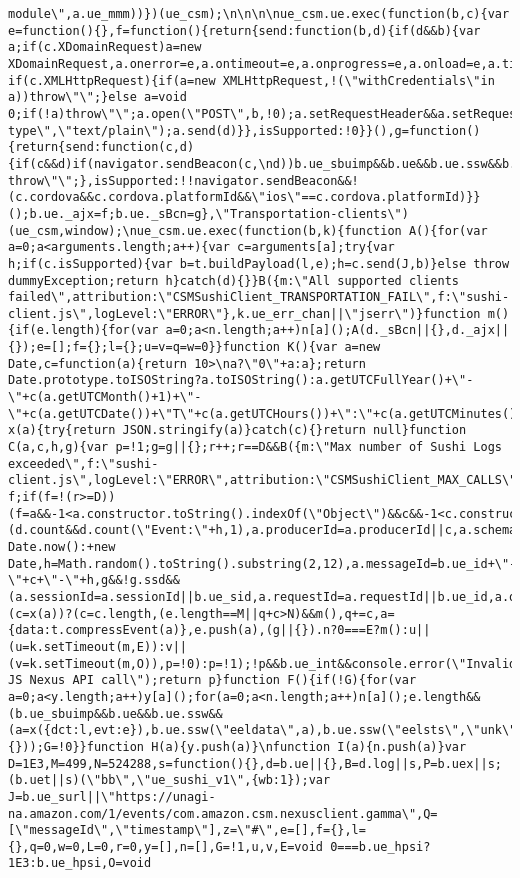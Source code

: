 \documentclass[
]{article}
\begin{document}
\begin{verbatim}
module\",a.ue_mmm))})(ue_csm);\n\n\n\nue_csm.ue.exec(function(b,c){var e=function(){},f=function(){return{send:function(b,d){if(d&&b){var a;if(c.XDomainRequest)a=new XDomainRequest,a.onerror=e,a.ontimeout=e,a.onprogress=e,a.onload=e,a.timeout=0;else if(c.XMLHttpRequest){if(a=new XMLHttpRequest,!(\"withCredentials\"in a))throw\"\";}else a=void 0;if(!a)throw\"\";a.open(\"POST\",b,!0);a.setRequestHeader&&a.setRequestHeader(\"Content-type\",\"text/plain\");a.send(d)}},isSupported:!0}}(),g=function(){return{send:function(c,d){if(c&&d)if(navigator.sendBeacon(c,\nd))b.ue_sbuimp&&b.ue&&b.ue.ssw&&b.ue.ssw(\"eelsts\",\"scs\");else throw\"\";},isSupported:!!navigator.sendBeacon&&!(c.cordova&&c.cordova.platformId&&\"ios\"==c.cordova.platformId)}}();b.ue._ajx=f;b.ue._sBcn=g},\"Transportation-clients\")(ue_csm,window);\nue_csm.ue.exec(function(b,k){function A(){for(var a=0;a<arguments.length;a++){var c=arguments[a];try{var h;if(c.isSupported){var b=t.buildPayload(l,e);h=c.send(J,b)}else throw dummyException;return h}catch(d){}}B({m:\"All supported clients failed\",attribution:\"CSMSushiClient_TRANSPORTATION_FAIL\",f:\"sushi-client.js\",logLevel:\"ERROR\"},k.ue_err_chan||\"jserr\")}function m(){if(e.length){for(var a=0;a<n.length;a++)n[a]();A(d._sBcn||{},d._ajx||{});e=[];f={};l={};u=v=q=w=0}}function K(){var a=new Date,c=function(a){return 10>\na?\"0\"+a:a};return Date.prototype.toISOString?a.toISOString():a.getUTCFullYear()+\"-\"+c(a.getUTCMonth()+1)+\"-\"+c(a.getUTCDate())+\"T\"+c(a.getUTCHours())+\":\"+c(a.getUTCMinutes())+\":\"+c(a.getUTCSeconds())+\".\"+String((a.getUTCMilliseconds()/1E3).toFixed(3)).slice(2,5)+\"Z\"}function x(a){try{return JSON.stringify(a)}catch(c){}return null}function C(a,c,h,g){var p=!1;g=g||{};r++;r==D&&B({m:\"Max number of Sushi Logs exceeded\",f:\"sushi-client.js\",logLevel:\"ERROR\",attribution:\"CSMSushiClient_MAX_CALLS\"},k.ue_err_chan||\n\"jserr\");var f;if(f=!(r>=D))(f=a&&-1<a.constructor.toString().indexOf(\"Object\")&&c&&-1<c.constructor.toString().indexOf(\"String\")&&h&&-1<h.constructor.toString().indexOf(\"String\"))||L++;f&&(d.count&&d.count(\"Event:\"+h,1),a.producerId=a.producerId||c,a.schemaId=a.schemaId||h,a.timestamp=K(),c=Date.now?Date.now():+new Date,h=Math.random().toString().substring(2,12),a.messageId=b.ue_id+\"-\"+c+\"-\"+h,g&&!g.ssd&&(a.sessionId=a.sessionId||b.ue_sid,a.requestId=a.requestId||b.ue_id,a.obfuscatedMarketplaceId=\na.obfuscatedMarketplaceId||b.ue_mid),(c=x(a))?(c=c.length,(e.length==M||q+c>N)&&m(),q+=c,a={data:t.compressEvent(a)},e.push(a),(g||{}).n?0===E?m():u||(u=k.setTimeout(m,E)):v||(v=k.setTimeout(m,O)),p=!0):p=!1);!p&&b.ue_int&&console.error(\"Invalid JS Nexus API call\");return p}function F(){if(!G){for(var a=0;a<y.length;a++)y[a]();for(a=0;a<n.length;a++)n[a]();e.length&&(b.ue_sbuimp&&b.ue&&b.ue.ssw&&(a=x({dct:l,evt:e}),b.ue.ssw(\"eeldata\",a),b.ue.ssw(\"eelsts\",\"unk\")),A(d._sBcn||{}));G=!0}}function H(a){y.push(a)}\nfunction I(a){n.push(a)}var D=1E3,M=499,N=524288,s=function(){},d=b.ue||{},B=d.log||s,P=b.uex||s;(b.uet||s)(\"bb\",\"ue_sushi_v1\",{wb:1});var J=b.ue_surl||\"https://unagi-na.amazon.com/1/events/com.amazon.csm.nexusclient.gamma\",Q=[\"messageId\",\"timestamp\"],z=\"#\",e=[],f={},l={},q=0,w=0,L=0,r=0,y=[],n=[],G=!1,u,v,E=void 0===b.ue_hpsi?1E3:b.ue_hpsi,O=void 
\end{verbatim}
\end{document}
